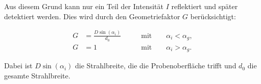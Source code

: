 Aus diesem Grund kann nur ein Teil der Intensität $I$ reflektiert und später detektiert werden. Dies wird durch den 
Geometriefaktor $G$ berücksichtigt:

\begin{align*}
    G &= \frac{D\sin{\left(\alpha_i\right)}}{d_0} \qquad &\text{mit} \qquad \alpha_i < \alpha_g,\\
    G &= 1 \qquad &\text{mit} \qquad \alpha_i > \alpha_g.
\end{align*}

Dabei ist $D\sin{\left(\alpha_i\right)}$ die Strahlbreite, die die Probenoberfläche trifft und $d_0$ die gesamte
Strahlbreite.  